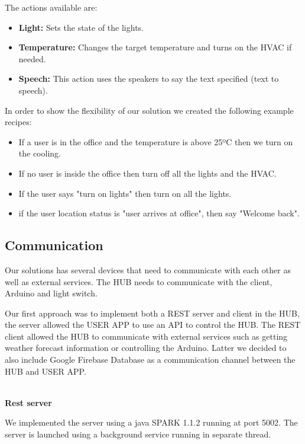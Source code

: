 The actions available are:

\begin{itemize}
  \item \textbf{Light:} Sets the state of the lights.
  \item \textbf{Temperature:} Changes the target temperature and turns on the HVAC if needed.
  \item \textbf{Speech:} This action uses the speakers to say the text specified (text to speech).
\end{itemize}


In order to show the flexibility of our solution we created the following example recipes:
\begin{itemize}
  \item If a user is in the office and the temperature is above 25ºC then we turn on the cooling.
  \item If no user is inside the office then turn off all the lights and the HVAC.
  \item If the user says "turn on lights" then turn on all the lights.
  \item if the user location status is "user arrives at office", then say "Welcome back".
 
\end{itemize}



\subsection{Communication}

Our solutions has several devices that need to communicate with each other as well as external services.
The HUB needs to communicate with the client, Arduino and light switch. 

Our first approach was to implement both a \ac{REST} server and client in the HUB, the server allowed the USER APP to use an API to control the HUB. The \ac{REST} client allowed the HUB to communicate with external services such as getting weather forecast information or controlling the Arduino.
Latter we decided to also include Google Firebase Database as a communication channel between the HUB and USER APP.


\mbox{}\\
\textbf{Rest server}

We implemented the server using a java SPARK 1.1.2 running at port 5002. The server is launched using a background service running in separate thread.

